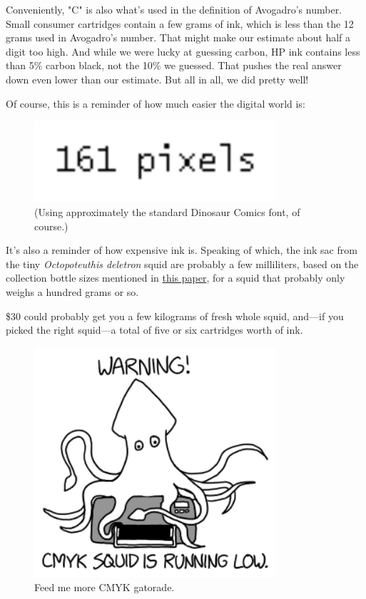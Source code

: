 {{Conveniently, "C" is also what's used in the definition of Avogadro's number. Small consumer cartridges contain a few grams of ink, which is less than the 12 grams used in Avogadro's number. That might make our estimate about half a digit too high. And while we were lucky at guessing carbon, HP ink contains less than 5\% carbon black, not the 10\% we guessed. That pushes the real answer down even lower than our estimate. But all in all, we did pretty well!}

{Of course, this is a reminder of how much easier the digital world is:}

\begin{figure}[!htbp]
\centering
\includegraphics[scale=0.5, max width=0.8\textwidth]{imgs/a/106/pixels.png}
\caption{(Using approximately the standard Dinosaur Comics font, of course.)}
\end{figure}

{It's also a reminder of how expensive ink is. Speaking of which, the ink sac from the tiny \emph{Octopoteuthis deletron} squid are probably a few milliliters, based on the collection bottle sizes mentioned in \href{http://gradworks.umi.com/3402685.pdf}{this paper}, for a squid that probably only weighs a hundred grams or so.}

{\$30 could probably get you a few kilograms of fresh whole squid, and—if you picked the right squid—a total of five or six cartridges worth of ink.}

\begin{figure}[!htbp]
\centering
\includegraphics[scale=0.5, max width=0.8\textwidth]{imgs/a/106/squid.png}
\caption{Feed me more CMYK gatorade.}
\end{figure}

}
